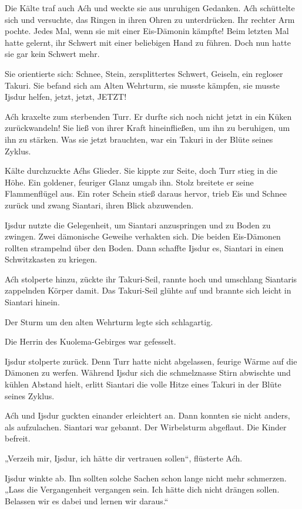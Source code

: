 Die Kälte traf auch Aćh und weckte sie aus unruhigen Gedanken. Aćh schüttelte sich und versuchte, das Ringen in ihren Ohren zu unterdrücken. Ihr rechter Arm pochte. Jedes Mal, wenn sie mit einer Eis-Dämonin kämpfte! Beim letzten Mal hatte gelernt, ihr Schwert mit einer beliebigen Hand zu führen. Doch nun hatte sie gar kein Schwert mehr.

Sie orientierte sich: Schnee, Stein, zersplittertes Schwert, Geiseln, ein regloser Takuri. Sie befand sich am Alten Wehrturm, sie musste kämpfen, sie musste Ijsdur helfen, jetzt, jetzt, JETZT!

Aćh kraxelte zum sterbenden Turr. Er durfte sich noch nicht jetzt in ein Küken zurückwandeln! Sie ließ von ihrer Kraft hineinfließen, um ihn zu beruhigen, um ihn zu stärken. Was sie jetzt brauchten, war ein Takuri in der Blüte seines Zyklus.

Kälte durchzuckte Aćhs Glieder. Sie kippte zur Seite, doch Turr stieg in die Höhe. Ein goldener, feuriger Glanz umgab ihn. Stolz breitete er seine Flammenflügel aus. Ein roter Schein stieß daraus hervor, trieb Eis und Schnee zurück und zwang Siantari, ihren Blick abzuwenden.

Ijsdur nutzte die Gelegenheit, um Siantari anzuspringen und zu Boden zu zwingen. Zwei dämonische Geweihe verhakten sich. Die beiden Eis-Dämonen rollten strampelnd über den Boden. Dann schaffte Ijsdur es, Siantari in einen Schwitzkasten zu kriegen.

Aćh stolperte hinzu, zückte ihr Takuri-Seil, rannte hoch und umschlang Siantaris zappelnden Körper damit. Das Takuri-Seil glühte auf und brannte sich leicht in Siantari hinein.

Der Sturm um den alten Wehrturm legte sich schlagartig.

Die Herrin des Kuolema-Gebirges war gefesselt.

Ijsdur stolperte zurück. Denn Turr hatte nicht abgelassen, feurige Wärme auf die Dämonen zu werfen. Während Ijsdur sich die schmelznasse Stirn abwischte und kühlen Abstand hielt, erlitt Siantari die volle Hitze eines Takuri in der Blüte seines Zyklus.

Aćh und Ijsdur guckten einander erleichtert an. Dann konnten sie nicht anders, als aufzulachen. Siantari war gebannt. Der Wirbelsturm abgeflaut. Die Kinder befreit.

„Verzeih mir, Ijsdur, ich hätte dir vertrauen sollen“, flüsterte Aćh.

Ijsdur winkte ab. Ihn sollten solche Sachen schon lange nicht mehr schmerzen. „Lass die Vergangenheit vergangen sein. Ich hätte dich nicht drängen sollen. Belassen wir es dabei und lernen wir daraus.“

